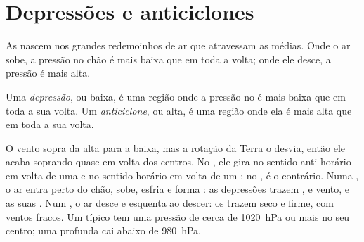 \section{Depressões e anticiclones}

As  nascem nos grandes redemoinhos de ar que atravessam as
 médias. Onde o ar sobe, a pressão no chão é mais baixa que em
toda a volta; onde ele desce, a pressão é mais alta.

\begin{definition}\label{def:g8:fronts-and-weather-maps:depression}
Uma \emph{depressão}, ou baixa, é uma região onde
a pressão no  é mais baixa que em toda a sua volta. Um
\emph{anticiclone}, ou alta, é uma região onde ela é
mais alta que em toda a sua volta.
\end{definition}
\label{def:g8:fronts-and-weather-maps:anticyclone}

O vento sopra da alta para a baixa, mas a rotação da Terra o desvia, então
ele acaba soprando quase em volta dos centros. No , ele
gira no sentido anti-horário em volta de uma  e no sentido
horário em volta de um ; no , é o contrário.
Numa , o ar entra perto do chão, sobe, esfria e forma : as
depressões trazem ,  e vento, e as suas . Num
, o ar desce e esquenta ao descer: os  trazem
 seco e firme, com ventos fracos. Um  típico tem uma
pressão de cerca de \qty{1020}{hPa} ou mais no seu centro; uma 
profunda cai abaixo de \qty{980}{hPa}.

